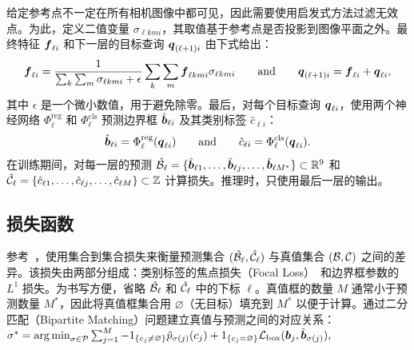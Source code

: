 给定参考点不一定在所有相机图像中都可见，因此需要使用启发式方法过滤无效点。为此，定义二值变量 $\sigma_{\ell k m i}$，其取值基于参考点是否投影到图像平面之外。最终特征 $\boldsymbol{f}_{\ell i}$ 和下一层的目标查询 $\boldsymbol{q}_{(\ell+1) i}$ 由下式给出：
\begin{equation}\label{eq:feature-agg}
    \begin{split}
        \boldsymbol{f}_{\ell i}  = \frac{1}{\sum_k\sum_m \sigma_{\ell k m i}+\epsilon}\sum_k \sum_m \boldsymbol{f}_{\ell k m i} \sigma_{\ell k m i} \qquad \mathrm{and} \qquad \boldsymbol{q}_{(\ell+1)i} = \boldsymbol{f}_{\ell i}  + \boldsymbol{q}_{\ell i},
    \end{split}
\end{equation}
其中 $\epsilon$ 是一个微小数值，用于避免除零。最后，对每个目标查询 $\boldsymbol{q}_{\ell i}$，使用两个神经网络 $\Phi_{\ell}^{\mathrm{reg}}$ 和 $\Phi_{\ell}^{\mathrm{cls}}$ 预测边界框 $\hat{\boldsymbol{b}}_{\ell i}$ 及其类别标签 $\hat{c}_{\ell i}$：
\begin{equation}\label{eq:prediction}
    \begin{split}
      \hat{\boldsymbol{b}}_{\ell i} = \Phi_{\ell}^{\mathrm{reg}}(\boldsymbol{q}_{\ell i})  \qquad \mathrm{and} \qquad   \hat{c}_{\ell i} = \Phi_{\ell}^{\mathrm{cls}}(\boldsymbol{q}_{\ell i}).
    \end{split}
\end{equation}
在训练期间，对每一层的预测 $\hat{\mathcal{B}}_\ell =\{\hat{\boldsymbol{b}}_{\ell 1}, \ldots, \hat{\boldsymbol{b}}_{\ell j}, \ldots, \hat{\boldsymbol{b}}_{\ell M^\ast}\}\subset\mathbb{R}^9$ 和 $\hat{\mathcal{C}}_\ell = \{\hat{c}_{\ell 1}, \ldots, \hat{c}_{\ell j}, \ldots, \hat{c}_{\ell M}\}\subset\mathbb{Z}$ 计算损失。推理时，只使用最后一层的输出。

\subsection{损失函数}
\label{loss}

参考~\cite{StewartAN16,detr}，使用集合到集合损失来衡量预测集合 $(\hat{\mathcal{B}}_\ell, \hat{\mathcal{C}}_\ell)$ 与真值集合 $(\mathcal{B}, \mathcal{C})$ 之间的差异。该损失由两部分组成：类别标签的焦点损失（Focal Loss）~\cite{lin2017focal}和边界框参数的 $L^1$ 损失。为书写方便，省略 $\hat{\mathcal{B}}_\ell$ 和 $\hat{\mathcal{C}}_\ell$ 中的下标 $\ell$。真值框的数量 $M$ 通常小于预测数量 $M^\ast$，因此将真值框集合用 $\varnothing$（无目标）填充到 $M^{\ast}$ 以便于计算。通过二分匹配（Bipartite Matching）问题建立真值与预测之间的对应关系：$\sigma^{\ast} = \operatorname*{arg\,min}_{\sigma \in \mathcal{P}}\sum_{j=1}^M -1_{\{c_j\neq\varnothing\}}\hat{p}_{\sigma(j)}(c_j) + 1_{\{c_j=\varnothing\}}\mathcal{L}_{\mathrm{box}}(\boldsymbol{b}_j, \hat{\boldsymbol{b}}_{\sigma(j)}),$

